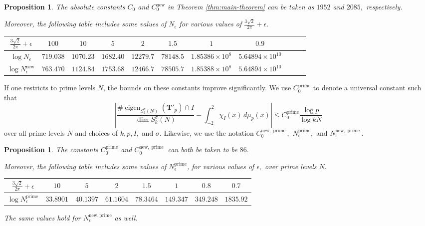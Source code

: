 \documentclass[11pt,letterpaper,reqno]{amsart}
\newtheorem{proposition}[theorem]{Proposition}
\theoremstyle{definition}
\numberwithin{equation}{section}
\numberwithin{figure}{section}
\numberwithin{table}{section}
\newcommand{\nw}{\mathrm{new}}
\begin{document}
\begin{proposition} \label{prop:explicit-constant-chart}
    The absolute constants $C_0$ and $C_0^\nw$ in Theorem \ref{thm:main-theorem} can be taken as $1952$ and $2085,$ respectively.
    
    Moreover, the following table includes some values of $N_\epsilon$ for various values of $\frac{3\sqrt{2}}{2\pi}+\epsilon.$

\begin{center}
    \begin{tabular}{|c||c|c|c|c|c|c|c|c|c|c|}
    \hline
       \phantom{$\frac{1^{1^1}}{1^{1^1}}$}
       $\frac{3\sqrt{2}}{2\pi} + \epsilon$ & $100$ & $10$ & $5$ & $2$ & $1.5$ & $1$ & $0.9$\\
    \hline
       $\log N_\epsilon$ & $719.038$ & $1070.23$ & $1682.40$ & $12279.7$ & $78148.5$ & $1.85386\times10^{8}$ & $5.64894 \times10^{10}$ \\
    \hline
       $\log N_\epsilon^\nw$ & $763.470$ & $1124.84$ & $1753.68$ & $12466.7$ & $78505.7$ & $1.85388\times10^{8}$ & $5.64894 \times10^{10}$  \\
    \hline
    \end{tabular}
\end{center}
\end{proposition}

If one restricts to prime levels $N$, the bounds on these constants improve significantly. We use $C_0^{\operatorname{prime}}$ to denote a universal constant such that
$$\left| \frac{\# \operatorname{eigen}_{S_k^{\sigma}(N)}(\mathbf{T}'_p) \cap I}{\dim S_k^{\sigma}(N)} - \int_{-2}^2 \chi_I(x) \, d \mu_p(x)  \right| \le C_0^{\operatorname{prime}}  \frac{\log p}{\log kN}$$
over all prime levels $N$ and choices of $k, p, I,$ and $\sigma.$
Likewise, we use the notation $C_0^{\nw, \operatorname{prime}},$ $N_\epsilon^{\operatorname{prime}},$ and $N_\epsilon^{\nw, \operatorname{prime}}$.


\begin{proposition}\label{prop:explicit-constant-chart-prime}
    The constants $C_0^{\operatorname{prime}}$ and $C_0^{\nw, \operatorname{prime}}$ can both be taken to be $86.$
    
    Moreover, the following table includes some values of $N_\epsilon^{\operatorname{prime}}$, for various values of $\epsilon,$ over prime levels $N.$

\begin{center}
    \begin{tabular}{|c||c|c|c|c|c|c|c|}
    \hline
       \phantom{$\frac{1^{1^1}}{1^{1^1}}$}
       $\frac{3\sqrt{2}}{2\pi} + \epsilon$ & $10$ & $5$ & $2$ & $1.5$ & $1$ & $0.8$ & $0.7$\\
    \hline
       $\log N_\epsilon^{\operatorname{prime}}$ & $33.8901$ & $40.1397$ & $61.1604$ & $78.3464$ & $149.347$ & $349.248$ & $1835.92$ \\
    \hline
    \end{tabular}
\end{center}
The same values hold for $N_\epsilon^{\nw, \text{prime}}$ as well.
\end{proposition}
\end{document}
